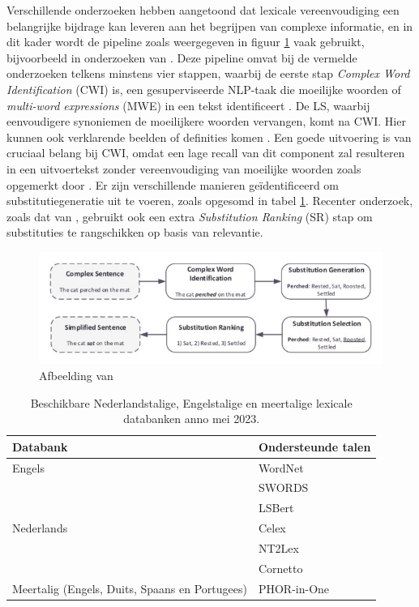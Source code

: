 \medspace

Verschillende onderzoeken hebben aangetoond dat lexicale vereenvoudiging een belangrijke bijdrage kan leveren aan het begrijpen van complexe informatie, en in dit kader wordt de pipeline zoals weergegeven in figuur \ref{img:pipeline-lexical-simplification} vaak gebruikt, bijvoorbeeld in onderzoeken van \textcite{Paetzold2016, Bingel2018, Bulte2018}. Deze pipeline omvat bij de vermelde onderzoeken telkens minstens vier stappen, waarbij de eerste stap \textit{Complex Word Identification} (CWI) is, een gesuperviseerde NLP-taak die moeilijke woorden of \textit{multi-word expressions} (MWE) in een tekst identificeert \autocite{Shardlow2013, Gooding2019}. De LS, waarbij eenvoudigere synoniemen de moeilijkere woorden vervangen, komt na CWI. Hier kunnen ook verklarende beelden of definities komen \autocite{Zeng2005, Kandula2010}. Een goede uitvoering is van cruciaal belang bij CWI, omdat een lage recall van dit component zal resulteren in een uitvoertekst zonder vereenvoudiging van moeilijke woorden zoals opgemerkt door \textcite{Shardlow2013}. Er zijn verschillende manieren geïdentificeerd om substitutiegeneratie uit te voeren, zoals opgesomd in tabel \ref{table:lexical-databases}. Recenter onderzoek, zoals dat van \textcite{Zhou2019}, gebruikt ook een extra \textit{Substitution Ranking} (SR) stap om substituties te rangschikken op basis van relevantie. 

\begin{figure}[H]
	\includegraphics{img/lexical-simplification-pipeline.png}
	\caption{Afbeelding van \textcite{Althunayyan2021}}
	\label{img:pipeline-lexical-simplification}
\end{figure}

\begin{center}
\begin{table}[H]
	\begin{tabular}{ | m{7cm} | m{7cm} | } 
		\hline
		\textbf{Databank} & \textbf{Ondersteunde talen} \\
		\hline
		Engels & WordNet \\
		& SWORDS \\
		& LSBert \\
		\hline
		Nederlands & Celex \\
		& NT2Lex \\
		& Cornetto \\
		\hline
		Meertalig (Engels, Duits, Spaans en Portugees) & PHOR-in-One \\
		\hline	
	\end{tabular}
	\caption{Beschikbare Nederlandstalige, Engelstalige en meertalige lexicale databanken anno mei 2023.}
	\label{table:lexical-databases}
\end{table}
\end{center}

